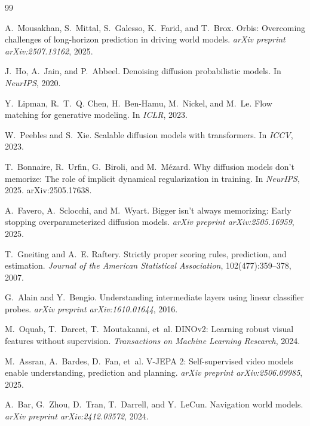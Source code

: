 \documentclass[addpoints]{exam}
\begin{document}
    \begin{thebibliography}{99}

    A.~Mousakhan, S.~Mittal, S.~Galesso, K.~Farid, and T.~Brox.
    \newblock Orbis: Overcoming challenges of long-horizon prediction in driving
    world models.
    \newblock \emph{arXiv preprint arXiv:2507.13162}, 2025.

    J.~Ho, A.~Jain, and P.~Abbeel.
    \newblock Denoising diffusion probabilistic models.
    \newblock In \emph{NeurIPS}, 2020.

    Y.~Lipman, R.~T.~Q. Chen, H.~Ben-Hamu, M.~Nickel, and M.~Le.
    \newblock Flow matching for generative modeling.
    \newblock In \emph{ICLR}, 2023.

    W.~Peebles and S.~Xie.
    \newblock Scalable diffusion models with transformers.
    \newblock In \emph{ICCV}, 2023.

    T.~Bonnaire, R.~Urfin, G.~Biroli, and M.~M\'ezard.
    \newblock Why diffusion models don't memorize: The role of implicit dynamical
    regularization in training.
    \newblock In \emph{NeurIPS}, 2025. arXiv:2505.17638.

    A.~Favero, A.~Sclocchi, and M.~Wyart.
    \newblock Bigger isn't always memorizing: Early stopping overparameterized
    diffusion models.
    \newblock \emph{arXiv preprint arXiv:2505.16959}, 2025.

    T.~Gneiting and A.~E. Raftery.
    \newblock Strictly proper scoring rules, prediction, and estimation.
    \newblock \emph{Journal of the American Statistical Association},
    102(477):359--378, 2007.

    G.~Alain and Y.~Bengio.
    \newblock Understanding intermediate layers using linear classifier probes.
    \newblock \emph{arXiv preprint arXiv:1610.01644}, 2016.

    M.~Oquab, T.~Darcet, T.~Moutakanni, et~al.
    \newblock DINOv2: Learning robust visual features without supervision.
    \newblock \emph{Transactions on Machine Learning Research}, 2024.

    M.~Assran, A.~Bardes, D.~Fan, et~al.
    \newblock V-JEPA 2: Self-supervised video models enable understanding,
    prediction and planning.
    \newblock \emph{arXiv preprint arXiv:2506.09985}, 2025.

    A.~Bar, G.~Zhou, D.~Tran, T.~Darrell, and Y.~LeCun.
    \newblock Navigation world models.
    \newblock \emph{arXiv preprint arXiv:2412.03572}, 2024.


\end{thebibliography}
\end{document}

